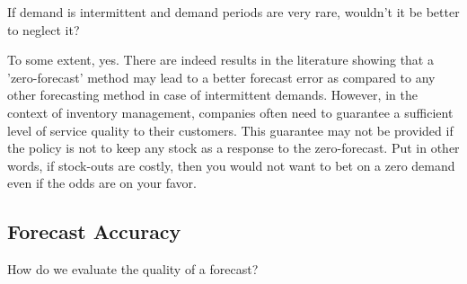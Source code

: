 \begin{question}
If demand is intermittent and demand periods are very rare, wouldn't it be better to neglect it?

\end{question}


  \begin{solution}
  To some extent, yes. There are indeed results in the literature showing that a 'zero-forecast' method may lead to a better forecast error as compared to any other forecasting method in case of intermittent demands. However, in the context of inventory management, companies often need to guarantee a sufficient level of service quality to their customers. This guarantee may not be provided if the policy is not to keep any stock as a response to the zero-forecast. Put in other words, if stock-outs are costly, then you would not want to bet on a zero demand even if the odds are on your favor.
  \end{solution}



\subsection{Forecast Accuracy}

\begin{question}
How do we evaluate the quality of a forecast?
\end{question}

